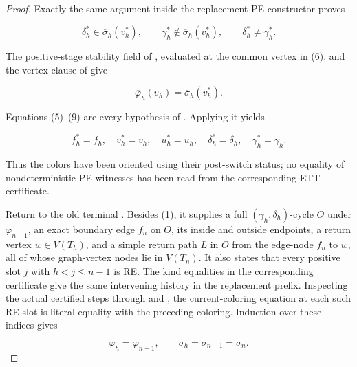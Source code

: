 \begin{proof}
Exactly the same argument inside the replacement PE constructor proves

\[
 \delta_h^*\in\overline\sigma_h(v_h^*),\qquad
 \gamma_h^*\notin\overline\sigma_h(v_h^*),\qquad
 \delta_h^*\ne\gamma_h^*.                                  \tag{8}
\]

The positive-stage stability field of
, evaluated at the common
vertex in (6), and the vertex clause of  give

\[
             \overline\varphi_h(v_h)=
             \overline\sigma_h(v_h^*).                      \tag{9}
\]

Equations (5)--(9) are every hypothesis of
.  Applying it yields

\[
 f_h^*=f_h,\quad v_h^*=v_h,\quad u_h^*=u_h,\quad
 \delta_h^*=\delta_h,\quad\gamma_h^*=\gamma_h.               \tag{10}
\]

Thus the colors have been oriented using their post-switch status; no
equality of nondeterministic PE witnesses has been read from the
corresponding-ETT certificate.

Return to the old terminal
.  Besides (1), it supplies a
full \((\gamma_h,\delta_h)\)-cycle \(O\) under
\(\varphi_{n-1}\), an exact boundary edge \(f_n\) on \(O\), its inside
and outside endpoints, a return vertex \(w\in V(T_h)\), and a simple
return path \(L\) in \(O\) from the edge-node \(f_n\) to \(w\), all of
whose graph-vertex nodes lie in \(V(T_n)\).  It also states that every
positive slot \(j\) with \(h<j\leq n-1\) is RE.  The kind equalities in
the corresponding certificate give the same intervening history in the
replacement prefix.  Inspecting the actual certified steps through
 and , the
current-coloring equation at each such RE slot is literal equality with
the preceding coloring.  Induction over these indices gives

\[
              \varphi_h=\varphi_{n-1},\qquad
              \sigma_h=\sigma_{n-1}=\sigma_n.                \tag{11}
\]


\end{proof}
